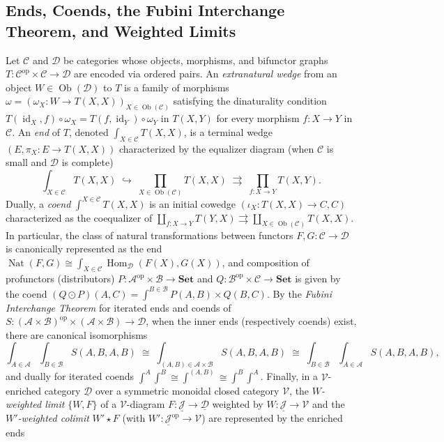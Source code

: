 \subsection{Ends, Coends, the Fubini Interchange Theorem, and Weighted Limits}
\label{subsec:ends_coends_fubini_weighted_limits}

Let $\mathcal{C}$ and $\mathcal{D}$ be categories whose objects, morphisms, and bifunctor graphs $T\colon \mathcal{C}^{\mathrm{op}} \times \mathcal{C} \to \mathcal{D}$ are encoded via ordered pairs. An \emph{extranatural wedge} from an object $W \in \operatorname{Ob}(\mathcal{D})$ to $T$ is a family of morphisms $\omega = (\omega_X\colon W \to T(X, X))_{X \in \operatorname{Ob}(\mathcal{C})}$ satisfying the dinaturality condition $T(\operatorname{id}_X, f) \circ \omega_X = T(f, \operatorname{id}_Y) \circ \omega_Y$ in $T(X, Y)$ for every morphism $f\colon X \to Y$ in $\mathcal{C}$. An \emph{end} of $T$, denoted $\int_{X \in \mathcal{C}} T(X, X)$, is a terminal wedge $(E, \pi_X\colon E \to T(X, X))$ characterized by the equalizer diagram (when $\mathcal{C}$ is small and $\mathcal{D}$ is complete)
\[
\int_{X \in \mathcal{C}} T(X, X) \;\hookrightarrow\; \prod_{X \in \operatorname{Ob}(\mathcal{C})} T(X, X) \;\rightrightarrows\; \prod_{f\colon X \to Y} T(X, Y).
\]
Dually, a \emph{coend} $\int^{X \in \mathcal{C}} T(X, X)$ is an initial cowedge $(\iota_X\colon T(X, X) \to C, C)$ characterized as the coequalizer of $\coprod_{f\colon X \to Y} T(Y, X) \rightrightarrows \coprod_{X \in \operatorname{Ob}(\mathcal{C})} T(X, X)$. In particular, the class of natural transformations between functors $F, G\colon \mathcal{C} \to \mathcal{D}$ is canonically represented as the end $\operatorname{Nat}(F, G) \cong \int_{X \in \mathcal{C}} \operatorname{Hom}_{\mathcal{D}}(F(X), G(X))$, and composition of profunctors (distributors) $P\colon \mathcal{A}^{\mathrm{op}} \times \mathcal{B} \to \mathbf{Set}$ and $Q\colon \mathcal{B}^{\mathrm{op}} \times \mathcal{C} \to \mathbf{Set}$ is given by the coend $(Q \odot P)(A, C) = \int^{B \in \mathcal{B}} P(A, B) \times Q(B, C)$. By the \emph{Fubini Interchange Theorem} for iterated ends and coends of $S\colon (\mathcal{A} \times \mathcal{B})^{\mathrm{op}} \times (\mathcal{A} \times \mathcal{B}) \to \mathcal{D}$, when the inner ends (respectively coends) exist, there are canonical isomorphisms
\[
\int_{A \in \mathcal{A}} \int_{B \in \mathcal{B}} S(A, B, A, B) \;\cong\; \int_{(A, B) \in \mathcal{A} \times \mathcal{B}} S(A, B, A, B) \;\cong\; \int_{B \in \mathcal{B}} \int_{A \in \mathcal{A}} S(A, B, A, B),
\]
and dually for iterated coends $\int^{A} \int^{B} \cong \int^{(A,B)} \cong \int^{B} \int^{A}$. Finally, in a $\mathcal{V}$-enriched category $\underline{\mathcal{D}}$ over a symmetric monoidal closed category $\mathcal{V}$, the \emph{$W$-weighted limit} $\{W, F\}$ of a $\mathcal{V}$-diagram $F\colon \underline{\mathcal{J}} \to \underline{\mathcal{D}}$ weighted by $W\colon \underline{\mathcal{J}} \to \mathcal{V}$ and the \emph{$W'$-weighted colimit} $W' \star F$ (with $W'\colon \underline{\mathcal{J}}^{\mathrm{op}} \to \mathcal{V}$) are represented by the enriched ends
